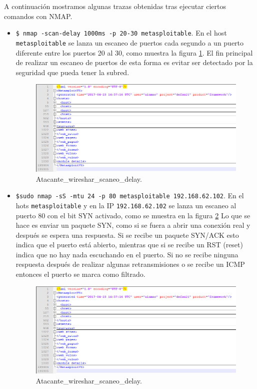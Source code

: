 \documentclass[a4,12pt,onecolum]{article}
\begin{document}
A continuación mostramos algunas trazas obtenidas tras ejecutar ciertos comandos con NMAP.

\begin{itemize}
  \item \texttt{\$ nmap -scan-delay 1000ms -p 20-30 metasploitable}. En el host \texttt{metasploitable} se lanza un escaneo de puertos cada segundo a un puerto diferente entre los puertos 20 al 30, como muestra la figura \ref{fig:nmap5}. El fin principal de realizar un escaneo de puertos de esta forma es evitar ser detectado por la seguridad que pueda tener la subred.

  \begin{figure}[htbp]
  \centering
  \includegraphics[width=1.0\textwidth]{./images/Atacante_scaner_y_BBDD.png}
  \caption{Atacante\_wireshar\_scaneo\_delay.}
  \label{fig:nmap5}
  \end{figure}

  \item \texttt{\$sudo nmap -sS -mtu 24 -p 80 metasploitable 192.168.62.102}. En el hots \texttt{metasploitable} y en la IP \texttt{192.168.62.102} se lanza un escaneo al puerto 80 con el bit SYN activado, como se muestra en la figura \ref{fig:nmap6} Lo que se hace es enviar un paquete SYN, como si se fuera a abrir una conexión real y después se espera una respuesta. Si se recibe un paquete SYN/ACK esto indica que el puerto está abierto, mientras que si se recibe un RST (reset) indica que no hay nada escuchando en el puerto. Si no se recibe ninguna respuesta después de realizar algunas retransmisiones o se recibe un ICMP entonces el puerto se marca como filtrado.

  \begin{figure}[htbp]
  \centering
  \includegraphics[width=1.0\textwidth]{./images/Atacante_scaner_y_BBDD.png}
  \caption{Atacante\_wireshar\_scaneo\_delay.}
  \label{fig:nmap6}
  \end{figure}
\end{itemize}
\end{document}
